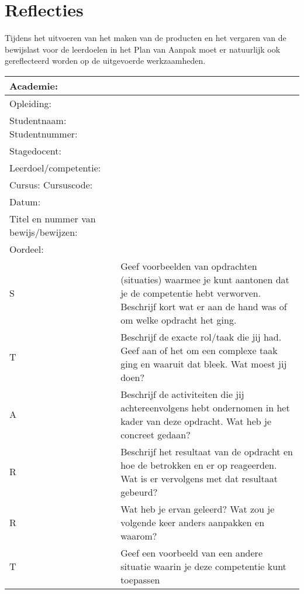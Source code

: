 \section{Reflecties}
Tijdens het uitvoeren van het maken van de producten en het vergaren van de bewijslast voor de leerdoelen in het Plan van Aanpak moet er natuurlijk ook gereflecteerd worden op de uitgevoerde werkzaamheden.


\begin{tabular}{l | l}
\hline
Academie: \\ \hline
Opleiding: \\ \hline
Studentnaam:         Studentnummer: \\ \hline
Stagedocent: \\ \hline
Leerdoel/competentie: \\ \hline
Cursus:               Cursuscode: \\ \hline 
Datum: \\ \hline
Titel en nummer van bewijs/bewijzen: \\ \hline
Oordeel: \\ \hline
S & Geef voorbeelden van opdrachten (situaties) waarmee je kunt aantonen dat je de competentie hebt verworven. Beschrijf kort wat er aan de hand was of om welke opdracht het ging. \\ \hline
T & Beschrijf de exacte rol/taak die jij had. Geef aan of het om een complexe taak ging en waaruit dat bleek. Wat moest jij doen? \\ \hline
A & Beschrijf de activiteiten die jij achtereenvolgens hebt ondernomen in het kader van deze opdracht. Wat heb je concreet gedaan? \\ \hline
R & Beschrijf het resultaat van de opdracht en hoe de betrokken en er op reageerden. Wat is er vervolgens met dat resultaat gebeurd? \\ \hline
R & Wat heb je ervan geleerd? Wat zou je volgende keer anders aanpakken en waarom? \\ \hline
T & Geef een voorbeeld van een andere situatie waarin je deze competentie kunt toepassen \\ \hline
\end{tabular}